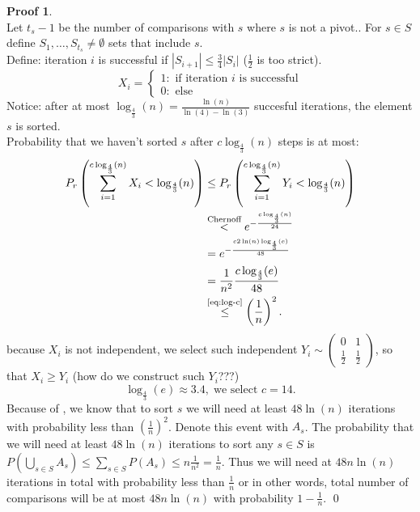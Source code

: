 \documentclass[a4paper, 12pt]{book}
\theoremstyle{definition}
\newtheorem{pro}[counter]{Proof}
\theoremstyle{remark}
\begin{document}
\begin{pro} \text{} \\
  Let $t_s - 1$ be the number of comparisons with $s$ where $s$ is not a pivot.. For $s \in S$ define $S_1, \dots, S_{t_s} \neq \emptyset$ sets that include $s$. \\
  Define: iteration $i$ is successful if $|S_{i+1}| \leq \frac{3}{4} |S_i|$ ($\frac{1}{2}$ is too strict).
  \begin{equation*}
    X_i = \begin{cases}
      1: \text{ if iteration } i \text{ is successful} \\
      0: \text{ else}
    \end{cases}
  \end{equation*}
  Notice: after at most $\log_{\frac{4}{3}}(n) = \frac{\ln(n)}{\ln(4)-\ln(3)}$ succesful iterations, the element $s$ is sorted. \\
  Probability that we haven't sorted $s$ after $c\log_{\frac{4}{3}}(n)$ steps is at most:
  \begin{align}
    P_r\left(\sum_{i=1}^{c \log_{\frac{4}{3}}(n)} X_i < \log_{\frac{4}{3}}(n)\right) &\leq
      P_r\left(\sum_{i=1}^{c \log_{\frac{4}{3}}(n)} Y_i < \log_{\frac{4}{3}}(n)\right) \label{eq:X_to_Y} \\
    &\stackrel{\text{Chernoff}}{<} e^{-\frac{c \log_{\frac{4}{3}}(n)}{24}} \nonumber \\
    &= e^{-\frac{c 2\ln(n) \log_{\frac{4}{3}}(e)}{48}} \nonumber\\
    &= \frac{1}{n^2} \frac{c \log_{\frac{4}{3}}(e)}{48} \nonumber \\
    &\stackrel{\refeq{eq:log-c}}{\leq} \left(\frac{1}{n}\right)^2. \nonumber
  \end{align}
   because $X_i$ is not independent, we select such independent
  $Y_i \sim \begin{pmatrix}0 & 1 \\ \frac{1}{2} & \frac{1}{2}\end{pmatrix}$, so that $X_i \geq Y_i$ (how do we construct such $Y_i$???)
  \begin{equation}
    \label{eq:log-c}
    \log_{\frac{4}{3}}(e) \approx 3.4, \; \text{we select }c=14.
  \end{equation}
  Because of , we know that to sort $s$ we will need at least $48 \ln(n)$ iterations with probability less than $\left(\frac{1}{n}\right)^2$. Denote this event with $A_s$.
  The probability that we will need at least $48 \ln(n)$ iterations to sort any $s \in S$ is $P(\bigcup_{s \in S}A_s) \leq \sum_{s \in S}P(A_s) \leq n\frac{1}{n^2} = \frac{1}{n}$.
  Thus we will need at $48n\ln(n)$ iterations in total with probability less than $\frac{1}{n}$ or in other words, total number of comparisons will be at most $48n\ln(n)$ with probability $1 - \frac{1}{n}$.
  \qed
\end{pro}
\end{document}

